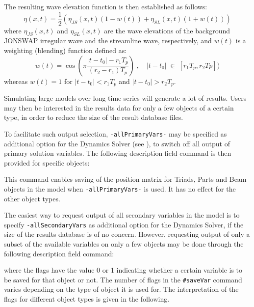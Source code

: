 \noindent
The resulting wave elevation function is then established as follows:
$$
\eta(x,t) = \frac{1}{2}\left(\eta_{JS}(x,t)(1-w(t))+\eta_{SL}(x,t)(1+w(t))\right)
$$
where $\eta_{JS}(x,t)$ and $\eta_{SL}(x,t)$ are the wave elevations of the
background JONSWAP irregular wave and the streamline wave, respectively,
and $w(t)$ is a weighting (blending) function defined as:
$$
w(t) = \cos\left(\pi\frac{|t-t_0|-r_1 T_p}{(r_2-r_1)T_p}\right)
\;,\quad |t-t_0| \;\in\; [r_1T_p,r_2 Tp])
$$
whereas $w(t)=1$ for $|t-t_0|<r_1T_p$ and $|t-t_0|>r_2T_p$.



Simulating large models over long time series will generate a lot of results.
Users may then be interested in the results data for only a few objects of a
certain type, in order to reduce the size of the result database files.

To facilitate such output selection, {\tt-allPrimaryVars-}
may be specified as additional option for the Dynamics Solver (see
),
to switch off all output of primary solution variables.
The following description field command is then provided for specific objects:


\noindent
This command enables saving of the position matrix for Triads, Parts and
Beam objects in the model when {\tt-allPrimaryVars-} is used.
It has no effect for the other object types.

The easiest way to request output of all secondary variables in the model is
to specify {\tt-allSecondaryVars} as additional option for the Dynamics Solver,
if the size of the results database is of no concern.
However, requesting output of only a subset of the available variables on only
a few objects may be done through the following description field command:


\noindent
where the {\tt{}} flags have the value 0 or 1 indicating whether
a certain variable is to be saved for that object or not.
The number of flags in the {\tt\#saveVar} command varies depending on
the type of object it is used for. The interpretation of the flags
for different object types is given in the following.


